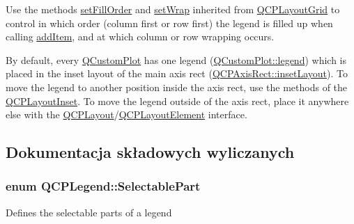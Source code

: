 Use the methods \hyperlink{class_q_c_p_layout_grid_affc2f3cfd22f28698c5b29b960d2a391}{set\+Fill\+Order} and \hyperlink{class_q_c_p_layout_grid_ab36af18d77e4428386d02970382ee598}{set\+Wrap} inherited from \hyperlink{class_q_c_p_layout_grid}{Q\+C\+P\+Layout\+Grid} to control in which order (column first or row first) the legend is filled up when calling \hyperlink{class_q_c_p_legend_a3ab274de52d2951faea45a6d975e6b3f}{add\+Item}, and at which column or row wrapping occurs.

By default, every \hyperlink{class_q_custom_plot}{Q\+Custom\+Plot} has one legend (\hyperlink{class_q_custom_plot_a4eadcd237dc6a09938b68b16877fa6af}{Q\+Custom\+Plot\+::legend}) which is placed in the inset layout of the main axis rect (\hyperlink{class_q_c_p_axis_rect_a4114887c7141b59650b7488f930993e5}{Q\+C\+P\+Axis\+Rect\+::inset\+Layout}). To move the legend to another position inside the axis rect, use the methods of the \hyperlink{class_q_c_p_layout_inset}{Q\+C\+P\+Layout\+Inset}. To move the legend outside of the axis rect, place it anywhere else with the \hyperlink{class_q_c_p_layout}{Q\+C\+P\+Layout}/\hyperlink{class_q_c_p_layout_element}{Q\+C\+P\+Layout\+Element} interface. 

\subsection{Dokumentacja składowych wyliczanych}
\subsubsection[{\texorpdfstring{Selectable\+Part}{SelectablePart}}]{\setlength{\rightskip}{0pt plus 5cm}enum {\bf Q\+C\+P\+Legend\+::\+Selectable\+Part}}\hypertarget{class_q_c_p_legend_a5404de8bc1e4a994ca4ae69e2c7072f1}{}\label{class_q_c_p_legend_a5404de8bc1e4a994ca4ae69e2c7072f1}
Defines the selectable parts of a legend

